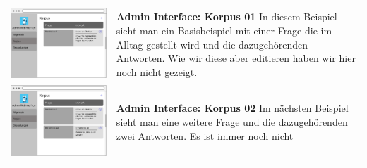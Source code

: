 \begin{tabular}{C{6cm}  L{7cm}}
    \includegraphics[width=\linewidth]{bilder/old vers. UI Design/Admin Interface I.png}  & \textbf{Admin Interface: Korpus 01} \newline
    In diesem Beispiel sieht man ein Basisbeispiel mit einer Frage die im Alltag gestellt wird und die dazugehörenden Antworten. Wie wir diese aber
    editieren haben wir hier noch nicht gezeigt.                                                                                           \\
    \includegraphics[width=\linewidth]{bilder/old vers. UI Design/Admin Interface II.png} & \textbf{Admin Interface: Korpus 02} \newline
    Im nächsten Beispiel sieht man eine weitere Frage und die dazugehörenden zwei Antworten. Es ist immer noch nicht

\end{tabular}
